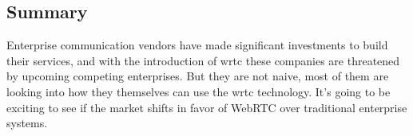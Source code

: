 \subsection*{Summary}
Enterprise communication vendors have made significant investments to build their services, and with the introduction of \gls{wrtc} these companies are threatened by upcoming competing enterprises. But they are not naive, most of them are looking into how they themselves can use the \gls{wrtc} technology. It's going to be exciting to see if the market shifts in favor of WebRTC over traditional enterprise systems.